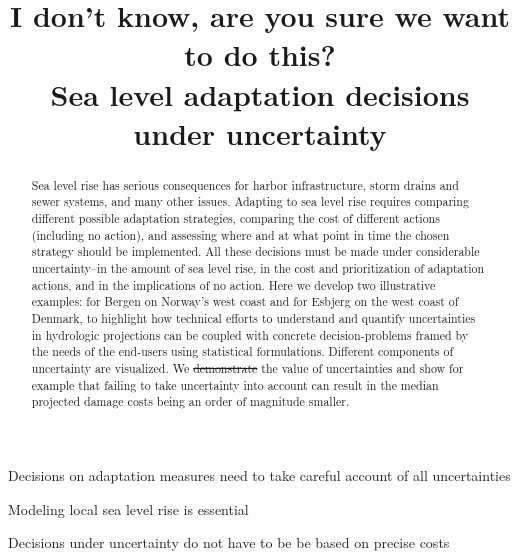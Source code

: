 \documentclass[draft,linenumbers]{agujournal}
\providecommand{\DIFadd}[1]{{\protect\color{blue}\uwave{#1}}} %
\providecommand{\DIFdel}[1]{{\protect\color{red}\sout{#1}}}                      %
\providecommand{\DIFaddbegin}{} %
\providecommand{\DIFaddend}{} %
\providecommand{\DIFdelbegin}{} %
\providecommand{\DIFdelend}{} %
\begin{document}
\title{I don't know, are you sure we want to do this?\\
Sea level adaptation decisions under uncertainty}




\begin{keypoints}
\item Decisions on adaptation measures need to take careful account of all uncertainties
\item Modeling local sea level rise is essential
\item Decisions under uncertainty do not have to be be based on precise costs
\end{keypoints}


\begin{abstract}
Sea level rise has serious consequences for harbor infrastructure, storm drains and sewer systems, and many other issues. Adapting to sea level rise requires comparing different possible adaptation strategies, comparing the cost of different actions (including no action), and assessing where and at what point in time the chosen strategy should be implemented. All these decisions must be made under considerable uncertainty--in the amount of sea level rise, in the cost and prioritization of adaptation actions, and in the implications of no action. Here we develop two illustrative examples: for Bergen on Norway's west coast and for Esbjerg on the west coast of Denmark, to highlight how technical efforts to understand and quantify uncertainties in hydrologic projections can be coupled with concrete decision-problems framed by the needs of the end-users using statistical formulations. Different components of uncertainty are visualized. We \DIFdelbegin \DIFdel{demonstrate }\DIFdelend \DIFaddbegin \DIFadd{demonstate }\DIFaddend the value of uncertainties and show for example that failing to take uncertainty into account can  result in the median projected damage costs being an order of magnitude smaller. 
\end{abstract}
\end{document}
